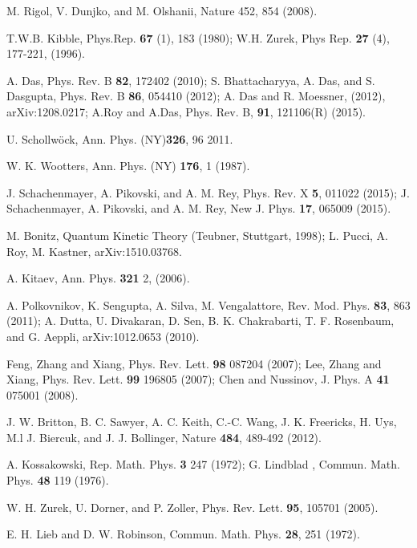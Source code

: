 \documentclass[a4paper,11pt,color]{article}
\renewenvironment{thebibliography}[1]{%
    \begin{oldthebibliography}{#1}%
      \setlength{\parskip}{0ex}%
      \setlength{\itemsep}{0ex}%
  }%
  {%
    \end{oldthebibliography}%
  }
\begin{document}
\begin{thebibliography}{}
  
M. Rigol, V. Dunjko, and M. Olshanii, Nature 452, 854 (2008).

T.W.B. Kibble, Phys.Rep. {\bf 67} (1), 183 (1980); W.H. Zurek, Phys Rep. {\bf 27} (4), 177-221, (1996).

A. Das, Phys. Rev. B {\bf 82}, 172402 (2010); S. Bhattacharyya, A. Das, and S. Dasgupta, Phys. Rev.
B {\bf 86}, 054410 (2012); A. Das and R. Moessner, (2012), arXiv:1208.0217; A.Roy and A.Das, Phys. Rev. B, {\bf 91}, 121106(R) (2015).

%
 {U.} {Schollw{\"o}ck},  {Ann. Phys. (NY)}\textbf {{326}}, {96}  {2011}.
 
W. K. Wootters, Ann. Phys. (NY) {\bf 176}, 1 (1987).

J. Schachenmayer, A. Pikovski, and A. M. Rey, Phys. Rev. X {\bf 5}, 011022 (2015); J. Schachenmayer, A. Pikovski, and A. M. Rey, New J. Phys.
{\bf 17}, 065009 (2015).

M. Bonitz, Quantum Kinetic Theory (Teubner, Stuttgart, 1998); L. Pucci, A. Roy, M. Kastner, arXiv:1510.03768.

A. Kitaev, Ann. Phys. {\bf 321} 2, (2006).

A. Polkovnikov, K. Sengupta, A. Silva, M. Vengalattore, Rev. Mod. Phys. \textbf{83}, 863 (2011); A. Dutta, U. Divakaran, D. Sen, B. K. Chakrabarti, T. F. Rosenbaum, and G. Aeppli, arXiv:1012.0653 (2010).

Feng, Zhang and Xiang, Phys. Rev. Lett. {\bf 98} 087204 (2007); Lee, Zhang and Xiang, Phys. Rev. Lett. {\bf 99} 196805 (2007); Chen and Nussinov, J. Phys. A {\bf 41} 075001 (2008).

J. W. Britton,	B. C. Sawyer,	A. C. Keith,	C.-C. Wang,	J. K. Freericks, H. Uys,	M.l J. Biercuk, and J. J. Bollinger, Nature {\bf 484}, 489-492 (2012).

A. Kossakowski, Rep. Math. Phys. {\bf 3} 247 (1972); G. Lindblad , Commun. Math. Phys. {\bf 48} 119 (1976).

W. H. Zurek, U. Dorner, and P. Zoller, Phys. Rev. Lett. {\bf 95}, 105701 (2005).

E. H. Lieb and D. W. Robinson, Commun. Math. Phys. {\bf 28}, 251 (1972).


\end{thebibliography}
\end{document}
